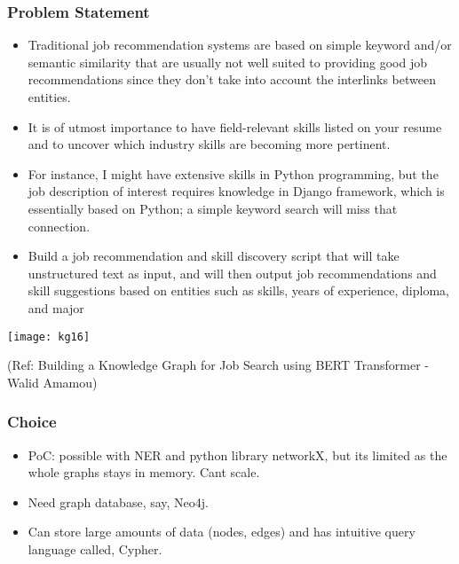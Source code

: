 \begin{frame}[fragile]\frametitle{Problem Statement}

\begin{itemize}
\item Traditional job recommendation systems are based on simple keyword and/or semantic similarity that are usually not well suited to providing good job recommendations since they don’t take into account the interlinks between entities. 
\item It is of utmost importance to have field-relevant skills listed on your resume and to uncover which industry skills are becoming more pertinent.
\item For instance, I might have extensive skills in Python programming, but the job description of interest requires knowledge in Django framework, which is essentially based on Python; a simple keyword search will miss that connection.
\item Build a job recommendation and skill discovery script that will take unstructured text as input, and will then output job recommendations and skill suggestions based on entities such as skills, years of experience, diploma, and major
\end{itemize}
	  
			\begin{center}
			\texttt{[image: kg16]}
			\end{center}	
			
			{\tiny (Ref: Building a Knowledge Graph for Job Search using BERT Transformer - Walid Amamou)}		
\end{frame}



\begin{frame}[fragile]\frametitle{Choice}

\begin{itemize}
\item PoC: possible with NER and python library networkX, but its limited as the whole graphs stays in memory. Cant scale.
\item Need graph database, say, Neo4j.
\item Can store large amounts of data (nodes, edges) and has intuitive query language called, Cypher.
\end{itemize}
	  
\end{frame}

